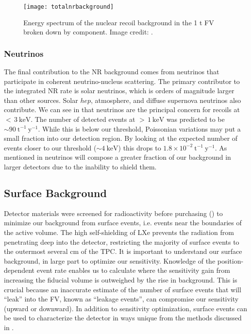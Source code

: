 \begin{figure}
\centering
\texttt{[image: totalnrbackground]}
\caption{Energy spectrum of the nuclear recoil background in the 1 t FV broken down by component.  Image credit: .}
\label{fig:backgrounds_nuclear_muon_induced_nr_rate}
\end{figure}



\subsubsection{Neutrinos}
\label{subsubsec:backgrounds_nuclear_neutrinos}
The final contribution to the NR background comes from neutrinos that participate in coherent neutrino-nucleus scattering.  The primary
contributor to the integrated NR rate is solar  neutrinos, which is orders of magnitude larger than other sources.  Solar $hep$,
atmosphere, and diffuse supernova neutrinos also contribute.  We can see in
 that neutrinos are the principal concern for recoils at
${<}\, 3\ \mathrm{keV}$.  The
number of detected events at ${>}\, 1\ \mathrm{keV}$ was predicted to be ${\sim} 90\ \mathrm{t^{-1}\ y^{-1}}$.  While this is below our
threshold, Poissonian variations may put a small fraction into our detection region.  By looking at the expected number of events closer
to our threshold (${\sim} 4\ \mathrm{keV}$) this drops to $1.8 \times 10^{-2}\ \mathrm{t^{-1}\ y^{-1}}$.  As mentioned in
 neutrinos will compose a greater fraction of our background in larger detectors
due to the inability to shield them.



\subsection{Surface Background}
\label{subsec:backgrounds_detector_materials}
Detector materials were screened for radioactivity before purchasing () to minimize
our background from surface events, i.e. events near the boundaries of the active volume.  The high self-shielding of LXe prevents the
radiation from penetrating deep into
the detector, restricting the majority of surface events to the outermost several cm of the TPC.  It is important to understand our
surface background, in large part to optimize our sensitivity.  Knowledge of the position-dependent event rate enables
us to calculate where the sensitivity gain from increasing the fiducial volume is outweighed by the rise in background.  This is crucial
because an inaccurate estimate of the number of surface events that will ``leak'' into the FV, known as ``leakage events'', can
compromise our sensitivity (upward or downward).  In addition to sensitivity optimization, surface events can be used to characterize
the detector in ways unique from the methods discussed in .

